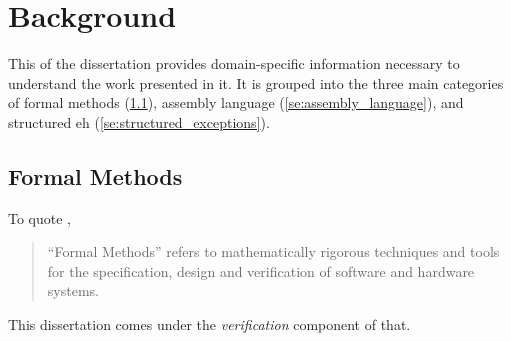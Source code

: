 \chapter{Background}\label{ch:background}
This  of the dissertation provides domain-specific information
necessary to understand the work presented in it.
It is grouped into the three main categories of
formal methods (\cref{se:formal_methods}),
assembly language (\cref{se:assembly_language}),
and structured \ac{eh} (\cref{se:structured_exceptions}).

%
%
\section{Formal Methods}\label{se:formal_methods}
To quote \textcite{butler:fm},
\begin{quote}
  ``Formal Methods''
  refers to mathematically rigorous techniques and tools
  for the specification, design and verification of software and hardware systems.
\end{quote}
This dissertation comes under the \emph{verification} component of that.%
%
%
%
%
%
